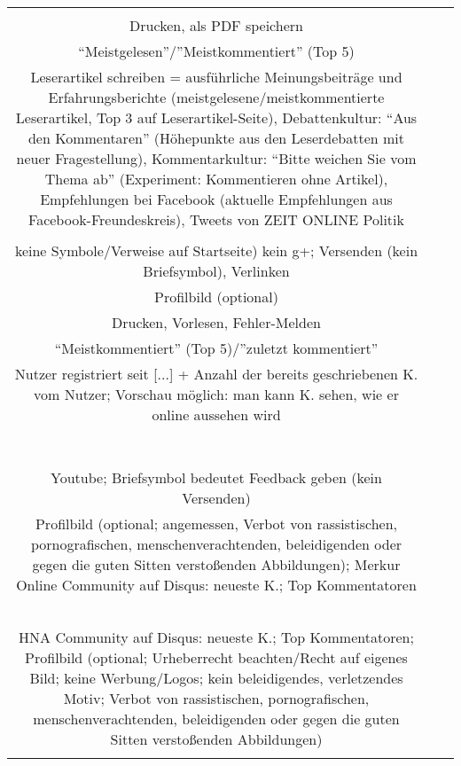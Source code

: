 \begin{landscape}
\begin{tabular}{ccc}
{		Profil anlegen möglich\\
		Drucken, als PDF speichern\\
		``Meistgelesen''/''Meistkommentiert'' (Top 5)\\
		Leserartikel schreiben = ausführliche Meinungsbeiträge und Erfahrungsberichte (meistgelesene/meistkommentierte Leserartikel, Top 3 auf Leserartikel-Seite), Debattenkultur: ``Aus den Kommentaren'' (Höhepunkte aus den Leserdebatten mit neuer Fragestellung), Kommentarkultur: ``Bitte weichen Sie vom Thema ab'' (Experiment: Kommentieren ohne Artikel), Empfehlungen bei Facebook (aktuelle Empfehlungen aus Facebook-Freundeskreis), Tweets von ZEIT ONLINE Politik\\
		&
		\\
		keine Symbole/Verweise auf Startseite) kein g+; Versenden (kein Briefsymbol), Verlinken\\
		Profilbild (optional)\\
		Drucken, Vorlesen, Fehler-Melden\\
		``Meistkommentiert'' (Top 5)/''zuletzt kommentiert''\\
		Nutzer registriert seit [...] + Anzahl der bereits geschriebenen K. vom Nutzer; Vorschau möglich: man kann K. sehen, wie er online aussehen wird\\
		&
		\\
		\\
		\\
		\\
		\\
		\\
		&
		\\
		Youtube; Briefsymbol bedeutet Feedback geben (kein Versenden)\\
		Profilbild (optional; angemessen, Verbot von rassistischen, pornografischen, menschenverachtenden, beleidigenden oder gegen die guten Sitten verstoßenden Abbildungen); Merkur Online Community auf Disqus: neueste K.; Top Kommentatoren\\
		\\
		\\
		\\
		&
		\\
		\\
		HNA Community auf Disqus: neueste K.; Top Kommentatoren; Profilbild (optional; Urheberrecht beachten/Recht auf eigenes Bild; keine Werbung/Logos; kein beleidigendes, verletzendes Motiv; Verbot von rassistischen, pornografischen, menschenverachtenden, beleidigenden oder gegen die guten Sitten verstoßenden Abbildungen)\\
}
\end{tabular}
\end{landscape}
